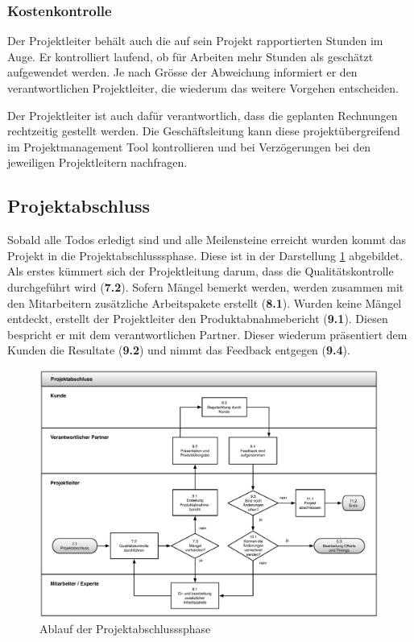 \subsubsection{Kostenkontrolle}
Der Projektleiter behält auch die auf sein Projekt rapportierten Stunden im Auge.
Er kontrolliert laufend, ob für Arbeiten mehr Stunden als geschätzt aufgewendet
werden. Je nach Grösse der Abweichung informiert er den verantwortlichen
Projektleiter, die wiederum das weitere Vorgehen entscheiden.

Der Projektleiter ist auch dafür verantwortlich, dass die geplanten Rechnungen
rechtzeitig gestellt werden. Die Geschäftsleitung kann diese projektübergreifend
im Projektmanagement Tool kontrollieren und bei Verzögerungen bei den jeweiligen
Projektleitern nachfragen.

\subsection{Projektabschluss}
Sobald alle Todos erledigt sind und alle Meilensteine erreicht wurden kommt
das Projekt in die Projektabschlusssphase. Diese ist in der Darstellung 
\ref{pic:02_03_projektabschluss} abgebildet. Als erstes kümmert sich der
Projektleitung darum, dass die Qualitätskontrolle durchgeführt wird (\textbf{7.2}). 
Sofern Mängel bemerkt werden, werden zusammen mit den Mitarbeitern zusätzliche
Arbeitspakete erstellt (\textbf{8.1}). Wurden keine Mängel entdeckt, erstellt
der Projektleiter den Produktabnahmebericht (\textbf{9.1}). Diesen bespricht er mit dem
verantwortlichen Partner. Dieser wiederum präsentiert dem Kunden die Resultate (\textbf{9.2})
und nimmt das Feedback entgegen (\textbf{9.4}).

\begin{figure}[htbp]
\begin{center}
\includegraphics[width=0.99\textwidth,angle=0]{./bilder/loesung/02_03_projektabschluss.pdf}
\caption[Ablauf der Projektabschlusssphase]{Ablauf der Projektabschlusssphase\footnotemark}
\label{pic:02_03_projektabschluss}
\end{center}
\end{figure}

